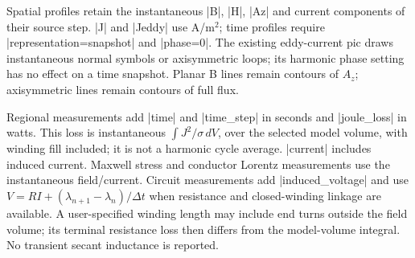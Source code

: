 Spatial profiles retain the instantaneous |B|, |H|, |Az| and current components
of their source step. |J| and |Jeddy| use A/m$^2$; time profiles require
|representation=snapshot| and |phase=0|. The existing eddy-current pic draws
instantaneous normal symbols or axisymmetric loops; its harmonic phase setting
has no effect on a time snapshot. Planar B lines remain contours of $A_z$;
axisymmetric lines remain contours of full flux.

Regional measurements add |time| and |time_step| in seconds and |joule_loss| in
watts. This loss is instantaneous $\int J^2/\sigma\,dV$, over the selected model
volume, with winding fill included; it is not a harmonic cycle average.
|current| includes induced current. Maxwell stress and conductor Lorentz
measurements use the instantaneous field/current. Circuit measurements add
|induced_voltage| and use $V=RI+(\lambda_{n+1}-\lambda_n)/\Delta t$ when resistance
and closed-winding linkage are available. A user-specified winding length may
include end turns outside the field volume; its terminal resistance loss then
differs from the model-volume integral. No transient secant inductance is reported.

